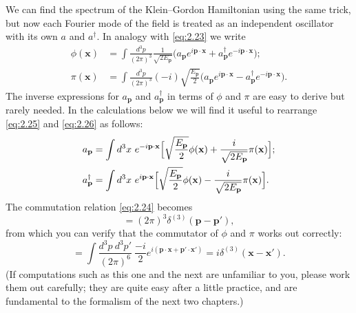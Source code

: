 We can find the spectrum of the Klein--Gordon Hamiltonian using the same
trick, but now each Fourier mode of the field is treated as an independent
oscillator with its own $a$ and $a^\dagger$.  In analogy with
\eqref{eq:2.23} we write
\begin{align}
  \phi(\mathbf{x}) &= \int \frac{d^3p}{(2\pi)^3}
    \frac{1}{\sqrt{2E_{\mathbf{p}}}}
    \bigl( a_{\mathbf{p}}e^{i\mathbf{p}\cdot\mathbf{x}}
      + a_{\mathbf{p}}^\dagger e^{-i\mathbf{p}\cdot\mathbf{x}} \bigr);
  \label{eq:2.25}\\
  \pi(\mathbf{x}) &= \int \frac{d^3p}{(2\pi)^3}
    (-i)\sqrt{\frac{E_{\mathbf{p}}}{2}}
    \bigl( a_{\mathbf{p}}e^{i\mathbf{p}\cdot\mathbf{x}}
      - a_{\mathbf{p}}^\dagger e^{-i\mathbf{p}\cdot\mathbf{x}} \bigr).
  \label{eq:2.26}
\end{align}
The inverse expressions for $a_{\mathbf{p}}$ and $a_{\mathbf{p}}^\dagger$
in terms of $\phi$ and $\pi$ are easy to derive but rarely needed.  In the
calculations below we will find it useful to rearrange \eqref{eq:2.25} and
\eqref{eq:2.26} as follows:
\begin{align}
  a_{\mathbf{p}} &= \int d^3x\ e^{-i\mathbf{p}\cdot\mathbf{x}}
    \Bigl[ \sqrt{\frac{E_{\mathbf{p}}}{2}}\phi(\mathbf{x})
      + \frac{i}{\sqrt{2E_{\mathbf{p}}}}\pi(\mathbf{x}) \Bigr];
  \label{eq:2.27}\\
  a_{\mathbf{p}}^\dagger &= \int d^3x\ e^{i\mathbf{p}\cdot\mathbf{x}}
    \Bigl[ \sqrt{\frac{E_{\mathbf{p}}}{2}}\phi(\mathbf{x})
      - \frac{i}{\sqrt{2E_{\mathbf{p}}}}\pi(\mathbf{x}) \Bigr].
  \label{eq:2.28}
\end{align}
The commutation relation \eqref{eq:2.24} becomes
\begin{equation}
  [a_{\mathbf{p}}, a_{\mathbf{p}'}^\dagger]
    = (2\pi)^3\delta^{(3)}(\mathbf{p}-\mathbf{p}'),
  \label{eq:2.29}
\end{equation}
from which you can verify that the commutator of $\phi$ and $\pi$ works
out correctly:
\begin{equation}
  [\phi(\mathbf{x}), \pi(\mathbf{x}')]
  = \int \frac{d^3p\ d^3p'}{(2\pi)^6}\ \frac{-i}{2}
    e^{i(\mathbf{p}\cdot\mathbf{x}+\mathbf{p}'\cdot\mathbf{x}')}
  = i\delta^{(3)}(\mathbf{x}-\mathbf{x}').
  \label{eq:2.30}
\end{equation}
(If computations such as this one and the next are unfamiliar to you,
please work them out carefully; they are quite easy after a little
practice, and are fundamental to the formalism of the next two chapters.)

